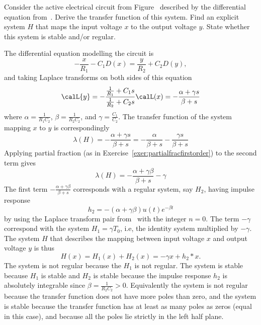 \begin{excersizelist}
\item Consider the active electrical circuit from Figure~ described by the differential equation from~.  Derive the transfer function of this system.  Find an explicit system $H$ that maps the input voltage $x$ to the output voltage $y$.  State whether this system is stable and/or regular.
\begin{solution}
The differential equation modelling the circuit is
\[
-\frac{x}{R_1} - C_1 D(x) = \frac{y}{R_2} + C_2 D(y),
\]
and taking Laplace transforms on both sides of this equation
\[
\calL{y} = -\frac{\tfrac{1}{R_1} + C_1s}{\tfrac{1}{R_2} + C_2s} \calL(x) = -\frac{\alpha + \gamma s}{\beta + s}
\]
where $\alpha = \tfrac{1}{R_1C_2}$, $\beta = \tfrac{1}{R_2C_2}$, and $\gamma = \tfrac{C_1}{C_2}$.  The transfer function of the system mapping $x$ to $y$ is correspondingly
\[
\lambda(H) = -\frac{\alpha + \gamma s}{\beta + s} = -\frac{\alpha}{\beta + s} - \frac{\gamma s}{\beta + s}
\]
Applying partial fraction (as in Exercise~\ref{exer:partialfracfirstorder}) to the second term gives
\[
\lambda(H) = -\frac{\alpha + \gamma\beta}{\beta + s} - \gamma
\]
The first term $-\frac{\alpha + \gamma\beta}{\beta + s}$ corresponds with a regular system, say $H_2$, having impulse response
\[
h_2 = -(\alpha + \gamma\beta) u(t) e^{-\beta t}
\]
by using the Laplace transform pair from~ with the integer $n=0$.  The term $-\gamma$ correspond with the system $H_1 = \gamma T_0$, i.e, the identity system multiplied by $-\gamma$.  The system $H$ that describes the mapping between input voltage $x$ and output voltage $y$ is thus
\[
H(x) = H_1(x) + H_2(x) = -\gamma x + h_2 * x.
\]
The system is not regular because the $H_1$ is not regular.  The system is stable because $H_1$ is stable and $H_2$ is stable because the impulse response $h_2$ is absolutely integrable since $\beta = \tfrac{1}{R_2C_2} > 0$.  Equivalently the system is not regular because the transfer function does not have more poles than zero, and the system is stable because the transfer function has at least as many poles as zeros (equal in this case), and because all the poles lie strictly in the left half plane. 
\end{solution}


\end{excersizelist}
